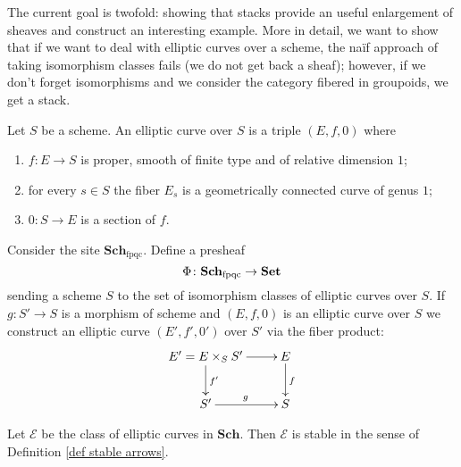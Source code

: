 \begin{refsection}
The current goal is twofold: showing that stacks provide an useful enlargement of sheaves and construct an interesting example. More in detail, we want to show that if we want to deal with elliptic curves over a scheme, the na{\"i}f approach of taking isomorphism classes fails (we do not get back a sheaf); however, if we don't forget isomorphisms and we consider the category fibered in groupoids, we get a stack.

\begin{defin}
Let $S$ be a scheme. An elliptic curve over $S$ is a triple $(E,f,0)$ where
\begin{enumerate}
\item $f \colon E \to S$ is proper, smooth of finite type and of relative dimension $1$;
\item for every $s \in S$ the fiber $E_s$ is a geometrically connected curve of genus $1$;
\item $0 \colon S \to E$ is a section of $f$.
\end{enumerate}
\end{defin}

Consider the site $\mathbf{Sch}_{\mathrm{fpqc}}$. Define a presheaf
\[
\Phi \colon \mathbf{Sch}_{\mathrm{fpqc}} \to \mathbf{Set}
\]
sending a scheme $S$ to the set of isomorphism classes of elliptic curves over $S$. If $g \colon S' \to S$ is a morphism of scheme and $(E,f,0)$ is an elliptic curve over $S$ we construct an elliptic curve $(E',f',0')$ over $S'$ via the fiber product:
\[
\xymatrix{
E' = E \times_S S' \ar[d]^{f'} \ar[r] & E \ar[d]^f \\ S' \ar[r]^g & S
}
\]

\begin{lemma} \label{lemma elliptic fibered}
Let $\mathcal E$ be the class of elliptic curves in $\mathbf{Sch}$. Then $\mathcal E$ is stable in the sense of Definition \ref{def stable arrows}.
\end{lemma}


\end{refsection}
